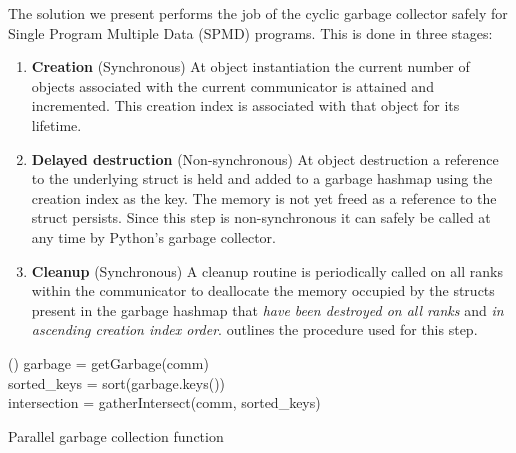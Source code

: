 \documentclass[a4paper,11pt]{article}
\begin{document}
The solution we present performs the job of the cyclic garbage collector safely for Single Program Multiple Data (SPMD) programs.
This is done in three stages:
\begin{enumerate}
	\item \label{item:create}\textbf{Creation} (Synchronous)
	At object instantiation the current number of objects associated with the current communicator is attained and incremented.
	This creation index is associated with that object for its lifetime.
	\item \label{item:destroy}\textbf{Delayed destruction} (Non-synchronous)
	At object destruction a reference to the underlying struct is held and added to a garbage hashmap using the creation index as the key.
	The memory is not yet freed as a reference to the struct persists.
	Since this step is non-synchronous it can safely be called at any time by Python's garbage collector.
	\item \label{item:cleanup}\textbf{Cleanup} (Synchronous)
	A cleanup routine is periodically called on all ranks within the communicator to deallocate the memory occupied by the structs present in the garbage hashmap that \emph{have been destroyed on all ranks} and \emph{in ascending creation index order}.
     outlines the procedure used for this step.
\end{enumerate}

\begin{algorithm}[htp]
	\Function(){
		garbage = getGarbage(comm)\\
		sorted\_keys = sort(garbage.keys())\\
		intersection = gatherIntersect(comm, sorted\_keys)\\
	}
	\caption[]{Parallel garbage collection function}
	\label{alg:cleanup}
\end{algorithm}
\end{document}
